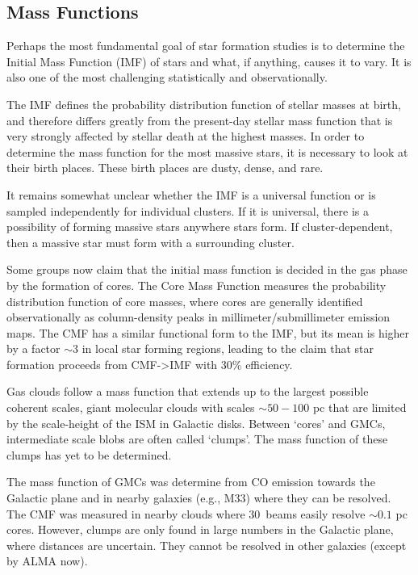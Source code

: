 \subsection{Mass Functions}
Perhaps the most fundamental goal of star formation studies is to determine the
Initial Mass Function (IMF) of stars and what, if anything, causes it to vary.
It is also one of the most challenging statistically and observationally.

The IMF defines the probability distribution function of stellar masses at
birth, and therefore differs greatly from the present-day stellar mass function
that is very strongly affected by stellar death at the highest masses.  In
order to determine the mass function for the most massive stars, it is
necessary to look at their birth places.  These birth places are dusty, dense,
and rare.  

It remains somewhat unclear whether the IMF is a universal function or is sampled
independently for individual clusters.  If it is universal, there is a possibility of
forming massive stars anywhere stars form.  If cluster-dependent, then a massive star
must form with a surrounding cluster.

Some groups now claim that the initial mass function is decided in the gas
phase by the formation of cores.  The Core Mass Function measures the
probability distribution function of core masses, where cores are generally
identified observationally as column-density peaks in millimeter/submillimeter
emission maps.  The CMF has a similar functional form to the IMF, but its mean
is higher by a factor $\sim3$ in local star forming regions, leading to the claim
that star formation proceeds from CMF->IMF with 30\% efficiency.

Gas clouds follow a mass function that extends up to the largest
possible coherent scales, giant molecular clouds with scales $\sim50-100$ pc
that are limited by the scale-height of the ISM in Galactic disks.
Between `cores' and GMCs, intermediate scale blobs are often called `clumps'. 
The mass function of these clumps has yet to be determined.  

The mass function of GMCs was determine from CO emission towards the Galactic
plane and in nearby galaxies (e.g., M33) where they can be resolved.  The CMF
was measured in nearby clouds where 30\arcsec\ beams easily resolve $\sim0.1$
pc cores.  However, clumps are only found in large numbers in the Galactic
plane, where distances are uncertain.  They cannot be resolved in other
galaxies (except by ALMA now).

